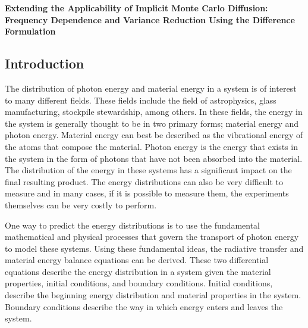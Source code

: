 
\ResetSingleSpace

\begin{center}
{\textbf{
Extending the Applicability of Implicit Monte Carlo Diffusion: \\ Frequency Dependence and Variance Reduction Using the Difference Formulation}}
\end{center}

\ResetDoubleSpace

\vskip0.25in

\begin{center}
\section{Introduction}
\label{sec:Intro}
\end{center}

\setcounter{page}{1}
\thispagestyle{empty}

\vskip-0.1in

\noindent
	\indent The distribution of photon energy and material energy in a system is of interest to many different fields. These fields include the field of astrophysics, glass manufacturing, stockpile stewardship, among others. In these fields, the energy in the system is generally thought to be in two primary forms; material energy and photon energy. Material energy can best be described as the vibrational energy of the atoms that compose the material. Photon energy is the energy that exists in the system in the form of photons that have not been absorbed into the material. The distribution of the energy in these systems has a significant impact on the final resulting product. The energy distributions can also be very difficult to measure and in many cases, if it is possible to measure them, the experiments themselves can be very costly to perform. 

	One way to predict the energy distributions is to use the fundamental mathematical and physical processes that govern the transport of photon energy to model these systems. Using these fundamental ideas, the radiative transfer and material energy balance equations can be derived. These two differential equations describe the energy distribution in a system given the material properties, initial conditions, and boundary conditions. Initial conditions, describe the beginning energy distribution and material properties in the system. Boundary conditions describe the way in which energy enters and leaves the system.

